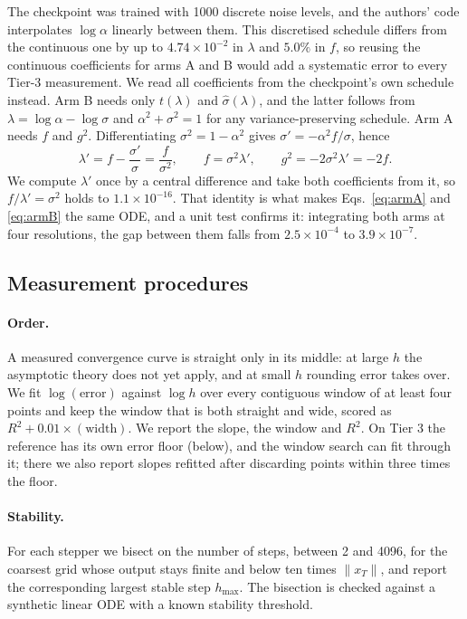 \documentclass[sigconf]{acmart}
\newcommand{\lam}{\lambda}
\begin{document}
The checkpoint was trained with 1000 discrete noise levels, and the authors' code
interpolates $\log\alpha$ linearly between them. This discretised schedule
differs from the continuous one by up to $4.74\times10^{-2}$ in $\lam$ and $5.0\%$
in $f$, so reusing the continuous coefficients for arms A and B would add a
systematic error to every Tier-3 measurement. We read all coefficients from the
checkpoint's own schedule instead. Arm B needs only $t(\lam)$ and
$\hat\sigma(\lam)$, and the latter follows from $\lam=\log\alpha-\log\sigma$ and
$\alpha^2+\sigma^2=1$ for any variance-preserving schedule. Arm A needs $f$ and
$g^2$. Differentiating $\sigma^2=1-\alpha^2$ gives $\sigma'=-\alpha^2f/\sigma$,
hence
\begin{equation}
\lam'=f-\frac{\sigma'}{\sigma}=\frac{f}{\sigma^2},\qquad
f=\sigma^2\lam',\qquad g^2=-2\sigma^2\lam'=-2f.
\label{eq:vpid}
\end{equation}
We compute $\lam'$ once by a central difference and take both coefficients from
it, so $f/\lam'=\sigma^2$ holds to $1.1\times10^{-16}$. That identity is what
makes Eqs.~\eqref{eq:armA} and \eqref{eq:armB} the same ODE, and a unit test
confirms it: integrating both arms at four resolutions, the gap between them falls
from $2.5\times10^{-4}$ to $3.9\times10^{-7}$.

\subsection{Measurement procedures}

\paragraph{Order.} A measured convergence curve is straight only in its middle:
at large $h$ the asymptotic theory does not yet apply, and at small $h$ rounding
error takes over. We fit $\log(\text{error})$ against $\log h$ over every
contiguous window of at least four points and keep the window that is both
straight and wide, scored as $R^2+0.01\times(\text{width})$. We report the slope,
the window and $R^2$. On Tier 3 the reference has its own error floor (below),
and the window search can fit through it; there we also report slopes refitted
after discarding points within three times the floor.

\paragraph{Stability.} For each stepper we bisect on the number of steps, between
2 and 4096, for the coarsest grid whose output stays finite and below ten times
$\lVert x_T\rVert$, and report the corresponding largest stable step $h_{\max}$.
The bisection is checked against a synthetic linear ODE with a known stability
threshold.
\end{document}
